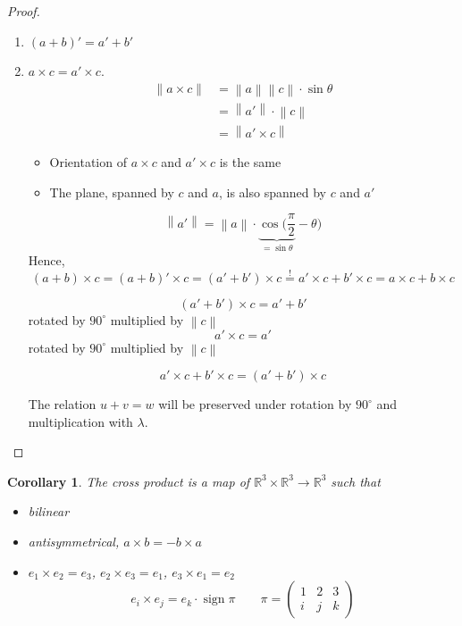 \documentclass{article}
\newtheorem{corollary}{Corollary}  \numberwithin{corollary}{section}
\newcommand{\norm}[1]{\left\|#1\right\|}
\DeclareMathOperator{\sign}{sign}
\begin{document}
\begin{proof}
\begin{itemize}
      \begin{enumerate}
        \item $(a+b)' = a' + b'$
        \item $a \times c = a' \times c$.
          \begin{align*}
            \norm{a \times c} &= \norm a \norm c \cdot \sin\theta \\
              &= \norm{a'} \cdot \norm{c} \\
              &= \norm{a' \times c}
          \end{align*}
          \begin{itemize}
            \item Orientation of $a \times c$ and $a' \times c$ is the same
            \item The plane, spanned by $c$ and $a$, is also spanned by $c$ and $a'$
          \end{itemize}

          \[ \norm{a'} = \norm{a} \cdot \underbrace{\cos(\frac\pi2}_{=\sin\theta} - \theta) \]
          Hence,
          \[ (a + b) \times c = (a + b)' \times c = (a' + b') \times c \stackrel!= a' \times c + b' \times c = a \times c + b \times c \]

          \[ (a' + b') \times c = a' + b' \]
          rotated by $90^\circ$ multiplied by $\norm{c}$
          \[ a' \times c = a' \]
          rotated by $90^\circ$ multiplied by $\norm{c}$

          \[ a' \times c + b' \times c = (a' + b') \times c \]

          The relation $u + v = w$ will be preserved under rotation by $90^\circ$ and multiplication with $\lambda$.
      \end{enumerate}
  \end{itemize}
\end{proof}

\begin{corollary} %
  The cross product is a map of $\mathbb R^3 \times \mathbb R^3 \to \mathbb R^3$
  such that
  \begin{itemize}
    \item bilinear
    \item antisymmetrical, $a \times b = -b \times a$
    \item $e_1 \times e_2 = e_3$, $e_2 \times e_3 = e_1$, $e_3 \times e_1 = e_2$
      \[ e_i \times e_j = e_k \cdot \sign{\pi} \qquad \pi = \begin{pmatrix} 1 & 2 & 3 \\ i & j & k \end{pmatrix} \]
  \end{itemize}
\end{corollary}
\end{document}
